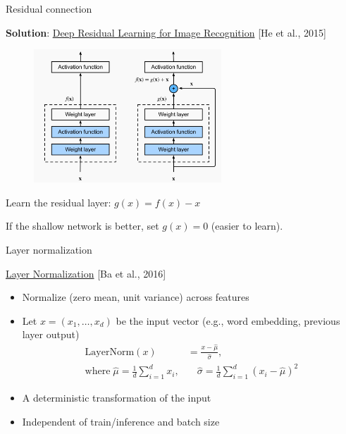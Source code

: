\documentclass[usenames,dvipsnames,notes,11pt,aspectratio=169,hyperref={colorlinks=true, linkcolor=blue}]{beamer}
\begin{document}
\begin{frame}
    {Residual connection}

    \textbf{Solution}: \href{https://arxiv.org/pdf/1512.03385.pdf}{Deep Residual Learning for Image Recognition} [He et al., 2015]\\
    \begin{figure}
        \includegraphics[height=5cm]{figures/residual}
    \end{figure}

    Learn the residual layer: $g(x) = f(x) - x$

    If the shallow network is better, set $g(x)=0$ (easier to learn).
\end{frame}

\begin{frame}
    {Layer normalization}
    
    \href{https://arxiv.org/pdf/1607.06450.pdf}{Layer Normalization} [Ba et al., 2016]\\
    \begin{itemize}
        \item Normalize (zero mean, unit variance) across features
        \item Let $x=(x_1,\ldots,x_d)$ be the input vector (e.g., word embedding, previous layer output)
            \begin{align*}
                \mathrm{LayerNorm}(x) &= \frac{x-\hat{\mu}}{\hat{\sigma}},\\
                \text{where} \; \hat{\mu} = \frac{1}{d}{\sum_{i=1}^d x_i}, &\quad \hat{\sigma} = \frac{1}{d}{\sum_{i=1}^d (x_i-\hat{\mu})^2}
            \end{align*}
        \pause
    \item A deterministic transformation of the input
    \item Independent of train/inference and batch size
    \end{itemize}
\end{frame}
\end{document}
